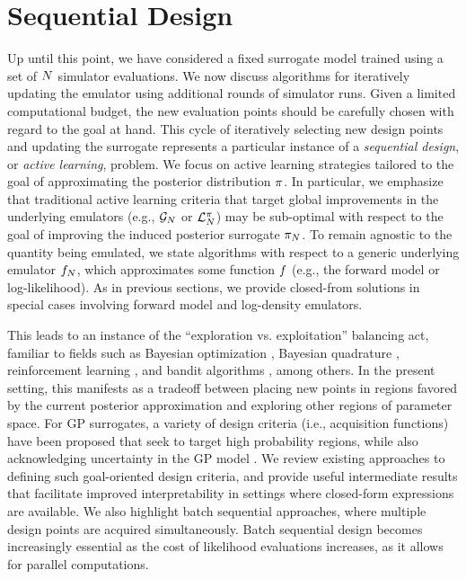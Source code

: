 \documentclass[12pt]{article}
\begin{document}
\section{Sequential Design} \label{sec:seq-design}
Up until this point, we have considered a fixed surrogate model trained using a set of
$\Ndesign$ simulator evaluations. We now discuss algorithms for iteratively 
updating the emulator using additional rounds of simulator runs. Given a limited 
computational budget, the new evaluation points should be carefully chosen with regard
to the goal at hand. This cycle of iteratively selecting new design points and updating 
the surrogate represents a particular instance of a \textit{sequential design},
or \textit{active learning}, problem. We focus on active learning strategies
tailored to the goal of approximating the posterior distribution $\postDens$. 
In particular, we emphasize that traditional active learning criteria
that target global improvements in the underlying emulators 
(e.g., $\fwdEm[\Ndesign]$ or $\lpostEm[\Ndesign]$) may be sub-optimal with 
respect to the goal of improving the induced posterior surrogate $\postEm[\Ndesign]$.
To remain agnostic to the quantity being emulated, we state algorithms with respect to
a generic underlying emulator $\funcEm[\Ndesign]$, which approximates some function
$\func$ (e.g., the forward model or log-likelihood). As in previous sections,
we provide closed-from solutions in special cases involving forward model and
log-density emulators.

This leads to an instance of the ``exploration vs. exploitation'' balancing act,
familiar to fields such as Bayesian optimization \citep{reviewBayesOpt}, Bayesian quadrature 
\citep{BayesQuadrature,BayesQuadratureAL,BayesQuadRatios,quadratureLogGP}, reinforcement learning 
\citep{BadiaRL,LiuRL}, and bandit algorithms \citep{banditsEmpirical,LattimoreBandits}, among others.
In the present setting, this 
manifests as a tradeoff between placing new points in regions favored by the current posterior approximation
and exploring other regions of parameter space. For GP surrogates, a variety of 
design criteria (i.e., acquisition functions) have been proposed that seek to target high probability regions, 
while also acknowledging uncertainty in the GP model 
\citep{SinsbeckNowak,Surer2023sequential,KandasamyActiveLearning2015,weightedIVAR,VehtariParallelGP,VillaniAdaptiveGP}.
We review existing approaches to defining such goal-oriented design criteria, and provide useful intermediate results that 
facilitate improved interpretability in settings where closed-form expressions are available.
We also highlight batch sequential approaches, where multiple design points are acquired simultaneously. 
Batch sequential design becomes increasingly essential as the cost of likelihood evaluations increases, as it allows for 
parallel computations. 
\end{document}
